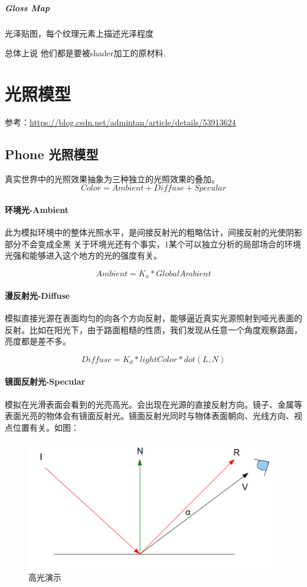\documentclass[UTF8,a4paper,12pt]{ctexbook}
\begin{document}
				\subparagraph{Gloss Map}
					光泽贴图，每个纹理元素上描述光泽程度
					
			总体上说 他们都是要被shader加工的原材料.
	
	\section{光照模型}
		参考：\url{https://blog.csdn.net/admintan/article/details/53913624}
		
		\subsection{Phone 光照模型}
			真实世界中的光照效果抽象为三种独立的光照效果的叠加。
				$$Color = Ambient + Diffuse + Specular$$
			
			\paragraph{环境光-Ambient}
				此为模拟环境中的整体光照水平，是间接反射光的粗略估计，间接反射的光使阴影部分不会变成全黑 关于环境光还有个事实，1某个可以独立分析的局部场合的环境光强和能够进入这个地方的光的强度有关。 
					
					$$Ambient = K_a * GlobalAmbient $$
					
			\paragraph{漫反射光-Diffuse}
				模拟直接光源在表面均匀的向各个方向反射，能够逼近真实光源照射到哑光表面的反射。比如在阳光下，由于路面粗糙的性质，我们发现从任意一个角度观察路面，亮度都是差不多。 
				
					$$Diffuse = K_d * lightColor * dot(L,N) $$
			\paragraph{镜面反射光-Specular}
				模拟在光滑表面会看到的光亮高光。会出现在光源的直接反射方向。镜子、金属等表面光亮的物体会有镜面反射光。镜面反射光同时与物体表面朝向、光线方向、视点位置有关。如图：
					\begin{figure}[H]
						\centering
						\includegraphics[scale=0.8]{Specular}
						\caption{高光演示}
					\end{figure}
				
\end{document}
